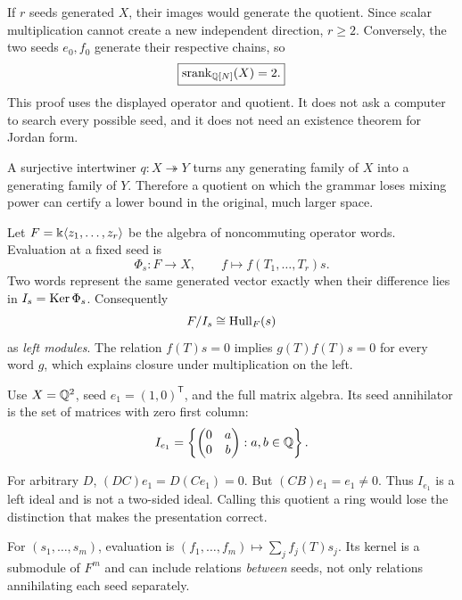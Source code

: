 If $r$ seeds generated $X$, their images would generate the quotient. Since scalar multiplication cannot create a new independent direction, $r\ge2$. Conversely, the two seeds $e_0,f_0$ generate their respective chains, so
\[
\boxed{\operatorname{srank}_{\mathbb Q[N]}(X)=2.}
\]
This proof uses the displayed operator and quotient. It does not ask a computer to search every possible seed, and it does not need an existence theorem for Jordan form.

A surjective intertwiner $q:X\twoheadrightarrow Y$ turns any generating family of $X$ into a generating family of $Y$. Therefore a quotient on which the grammar loses mixing power can certify a lower bound in the original, much larger space.


Let $F=\Bbbk\langle z_1,\ldots,z_r\rangle$ be the algebra of noncommuting operator words. Evaluation at a fixed seed is
\[
\Phi_s:F\to X,\qquad f\mapsto f(T_1,\ldots,T_r)s.
\]
Two words represent the same generated vector exactly when their difference lies in $I_s=\operatorname{Ker}\Phi_s$. Consequently
\[
F/I_s\cong\operatorname{Hull}_F(s)
\]
as \emph{left modules}. The relation $f(T)s=0$ implies $g(T)f(T)s=0$ for every word $g$, which explains closure under multiplication on the left.

Use $X=\mathbb Q^2$, seed $e_1=(1,0)^\mathsf T$, and the full matrix algebra. Its seed annihilator is the set of matrices with zero first column:
\[
I_{e_1}=\left\{\begin{pmatrix}0&a\\0&b\end{pmatrix}:a,b\in\mathbb Q\right\}.
\]


For arbitrary $D$, $(DC)e_1=D(Ce_1)=0$. But $(CB)e_1=e_1\ne0$. Thus $I_{e_1}$ is a left ideal and is not a two-sided ideal. Calling this quotient a ring would lose the distinction that makes the presentation correct.

For $(s_1,\ldots,s_m)$, evaluation is $(f_1,\ldots,f_m)\mapsto\sum_j f_j(T)s_j$. Its kernel is a submodule of $F^m$ and can include relations \emph{between} seeds, not only relations annihilating each seed separately.

